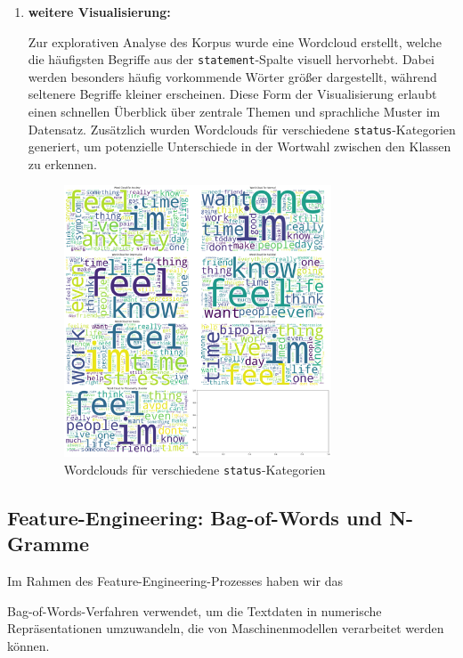 \begin{enumerate}
    \item \textbf{weitere Visualisierung:}
    
    Zur explorativen Analyse des Korpus wurde eine Wordcloud erstellt, welche die häufigsten Begriffe aus der \texttt{statement}-Spalte visuell hervorhebt. Dabei werden besonders häufig vorkommende Wörter größer dargestellt, während seltenere Begriffe kleiner erscheinen. Diese Form der Visualisierung erlaubt einen schnellen Überblick über zentrale Themen und sprachliche Muster im Datensatz. Zusätzlich wurden Wordclouds für verschiedene \texttt{status}-Kategorien generiert, um potenzielle Unterschiede in der Wortwahl zwischen den Klassen zu erkennen.

        \begin{figure}[h]
            \centering
            \includegraphics[width=0.75\textwidth]{images/wordcloud.png}
            \caption{Wordclouds für verschiedene \texttt{status}-Kategorien}
            \label{fig:wordcloud}
        \end{figure}

\end{enumerate}

\newpage

\subsection{Feature-Engineering: Bag-of-Words und N-Gramme}

Im Rahmen des Feature-Engineering-Prozesses haben wir das 

Bag-of-Words-Verfahren verwendet, um die Textdaten in numerische Repräsentationen umzuwandeln, die von Maschinenmodellen verarbeitet werden können. 

